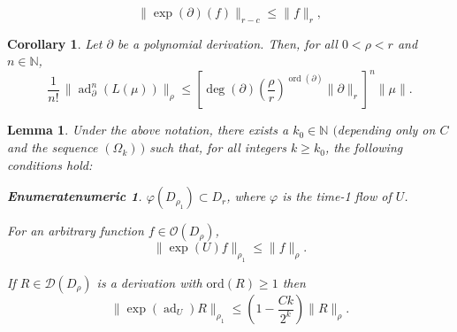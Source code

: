\documentclass[10pt,a4paper]{amsart}
\newtheorem{corollary}{Corollary}
\newtheorem{lemma}{Lemma}
\newtheorem{enumeratenumeric}{Enumeratenumeric}
\newcommand{\N}{\mathbb{N}}
\newcommand{\ad}{\operatorname{ad}}
\newcommand{\cD}{\mathcal{D}}
\newcommand{\oO}{\mathcal{O}}
\newcommand{\ord}{\mathrm{ord}}
\newcommand{\tmop}[1]{{\operatorname{#1}}}
\begin{document}
\begin{equation}\label{estimate-f-flow}
\| \exp(\partial)(f) \|_{r-c} \le \| f \|_r, 
\end{equation}

\begin{corollary}\label{Corollary-estimate-deg-ord}
Let $\partial$ be a polynomial derivation. Then, for all $0<\rho<r$ and $n \in \N$, 
$$
\frac{1}{n!}\, \|  \ad_\partial^n (L (\mu))  \|_{\rho} \leq
\left[ \deg (\partial)  \left( \frac{\rho}{r}\right)^{\tmop{ord} (\partial)} \|\partial\|_r
\right]^n 
 \| \mu \|.
$$
\end{corollary}

\begin{lemma}\label{lemma-bound-expU}
  Under the above notation, there exists a $k_0 \in \mathbb{N}$ $($depending only on $C$ and the sequence $(\Omega_k)\, )$ such that,
  for all integers $k \geq k_0$, the following conditions hold:
  \begin{enumeratenumeric}
    \item $\varphi (D_{\rho_1}) \subset D_r$, where $\varphi$ is the time-1
    flow of $U$. 
    \item For an arbitrary function $f \in \oO (D_{\rho})$, \ \
    \[ \| \exp (U) f \|_{\rho_1} \leq \| f \|_{\rho}. \]
    \item If $R \in \cD (D_{\rho})$ is a derivation with $\ord (R) \geq
    1$ then
        \[ \| \exp (\tmop{ad}_U) R \|_{\rho_1} \leqslant \left( 1 - \frac{C k}{2^k}
   \right)  \| R \|_{\rho}. \]
 \end{enumeratenumeric}
\end{lemma}
\end{document}
